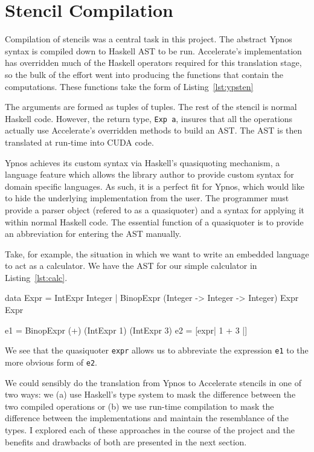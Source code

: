 \documentclass[
    12pt,
    a4paper,
    twoside,
    openright,
    ]{scrbook}
\begin{document}
\section{Stencil Compilation}

Compilation of stencils was a central task in this project. The abstract Ypnos
syntax is compiled down to Haskell AST to be run. Accelerate's implementation
has overridden much of the Haskell operators required for this translation
stage, so the bulk of the effort went into producing the functions that contain
the computations. These functions take the form of Listing~\ref{lst:ypsten}

The arguments are formed as tuples of tuples. The rest of the stencil is normal
Haskell code. However, the return type, \texttt{Exp a}, insures that all the
operations actually use Accelerate's overridden methods to build an AST. The AST
is then translated at run-time into CUDA code.

Ypnos achieves its custom syntax via Haskell's quasiquoting mechanism, a
language feature which allows the library author to provide custom syntax for
domain specific languages\cite{mainland2007}.  As such, it is a perfect fit for
Ypnos, which would like to hide the underlying implementation from the user. The
programmer must provide a parser object (refered to as a quasiquoter) and a
syntax for applying it within normal Haskell code. The essential function of a
quasiquoter is to provide an abbreviation for entering the AST manually.

Take, for example, the situation in which we want to write an embedded
language to act as a calculator. We have the AST for our
simple calculator in Listing~\ref{lst:calc}.

\begin{hflisting}[label={lst:calc}, caption={A simple calculator defined using an
  AST (\texttt{Expr}) and using a quasiquoter for abbreviated syntax. The definition of
  \texttt{expr} is omitted.}]
data Expr  =  IntExpr Integer
           |  BinopExpr (Integer -> Integer -> Integer) Expr Expr

e1 = BinopExpr (+) (IntExpr 1) (IntExpr 3)
e2 = [expr| 1 + 3 |]
\end{hflisting}

We see that the quasiquoter \texttt{expr} allows us to abbreviate the expression
\texttt{e1} to the more obvious form of \texttt{e2}.

We could sensibly do the translation from Ypnos to Accelerate stencils in one of
two ways: we (a) use Haskell's type system to mask the difference between the
two compiled operations or (b) we use run-time compilation to mask the
difference between the implementations and maintain the resemblance of the
types. I explored each of these approaches in the course of the project and the
benefits and drawbacks of both are presented in the next section.
\end{document}
